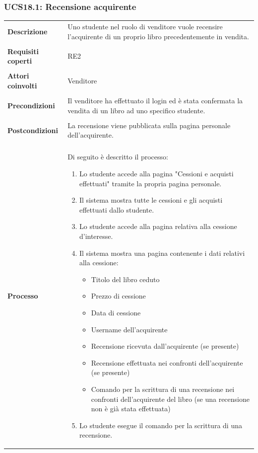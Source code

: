 \documentclass[10pt,a4paper]{report}
\begin{document}
	\subsubsection{UCS18.1: Recensione acquirente}
	\begin{tabular}{lp{}}
		\textbf{Descrizione}&Uno studente nel ruolo di venditore vuole recensire l'acquirente di un proprio libro precedentemente in vendita.\\
		\\
		\textbf{Requisiti coperti}&RE2\\
		\\
		\textbf{Attori coinvolti}&Venditore\\
		\\
		\textbf{Precondizioni}&Il venditore ha effettuato il login ed è stata confermata la vendita di un libro ad uno specifico studente.\\
		\\
		\textbf{Postcondizioni}&La recensione viene pubblicata sulla pagina personale dell'acquirente.\\
		\\
		\textbf{Processo}&Di seguito è descritto il processo:
		\begin{enumerate}
			\item Lo studente accede alla pagina "Cessioni e acquisti effettuati" tramite la propria pagina personale.
			\item Il sistema mostra tutte le cessioni e gli acquisti effettuati dallo studente.
			\item Lo studente accede alla pagina relativa alla cessione d'interesse.
			\item Il sistema mostra una pagina contenente i dati relativi alla cessione:
			\begin{itemize}
				\item Titolo del libro ceduto
				\item Prezzo di cessione
				\item Data di cessione
				\item Username dell'acquirente
				\item Recensione ricevuta dall'acquirente (se presente)
				\item Recensione effettuata nei confronti dell'acquirente (se presente)
				\item Comando per la scrittura di una recensione nei confronti dell'acquirente del libro (se una recensione non è già stata effettuata)
			\end{itemize}
			\item Lo studente esegue il comando per la scrittura di una recensione.

\end{enumerate}
\end{tabular}
\end{document}
